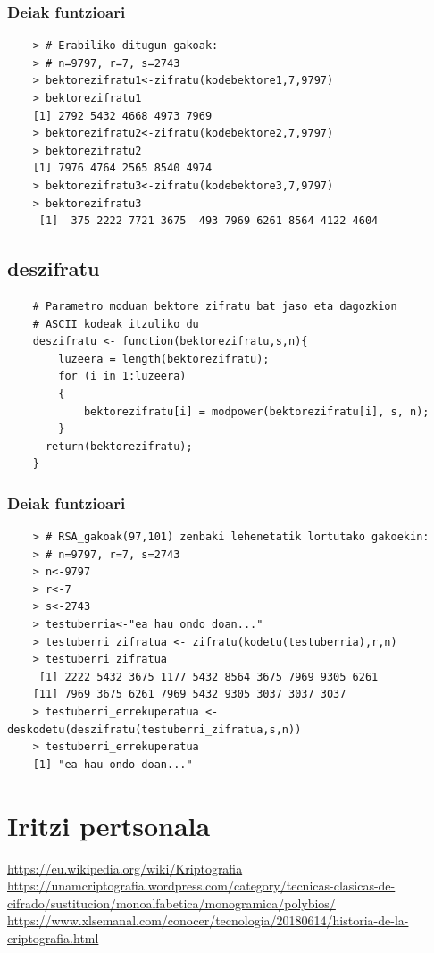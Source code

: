 \documentclass[12pt]{basque-book}
\begin{document}
\subsection{Deiak funtzioari}
\begin{verbatim}
    > # Erabiliko ditugun gakoak:
    > # n=9797, r=7, s=2743
    > bektorezifratu1<-zifratu(kodebektore1,7,9797)
    > bektorezifratu1
    [1] 2792 5432 4668 4973 7969
    > bektorezifratu2<-zifratu(kodebektore2,7,9797)
    > bektorezifratu2
    [1] 7976 4764 2565 8540 4974
    > bektorezifratu3<-zifratu(kodebektore3,7,9797)
    > bektorezifratu3
     [1]  375 2222 7721 3675  493 7969 6261 8564 4122 4604
\end{verbatim}

\newpage

\section{deszifratu}
\begin{verbatim}
    # Parametro moduan bektore zifratu bat jaso eta dagozkion 
    # ASCII kodeak itzuliko du
    deszifratu <- function(bektorezifratu,s,n){
        luzeera = length(bektorezifratu);
        for (i in 1:luzeera)
        {
            bektorezifratu[i] = modpower(bektorezifratu[i], s, n);
        }
      return(bektorezifratu);
    }
\end{verbatim}

\subsection{Deiak funtzioari}
\begin{verbatim}
    > # RSA_gakoak(97,101) zenbaki lehenetatik lortutako gakoekin:
    > # n=9797, r=7, s=2743
    > n<-9797
    > r<-7
    > s<-2743
    > testuberria<-"ea hau ondo doan..."
    > testuberri_zifratua <- zifratu(kodetu(testuberria),r,n)
    > testuberri_zifratua
     [1] 2222 5432 3675 1177 5432 8564 3675 7969 9305 6261
    [11] 7969 3675 6261 7969 5432 9305 3037 3037 3037
    > testuberri_errekuperatua <- deskodetu(deszifratu(testuberri_zifratua,s,n))
    > testuberri_errekuperatua
    [1] "ea hau ondo doan..."
\end{verbatim}


\chapter{Iritzi pertsonala}





\begin{thebibliography}{}
\bibitem{}\url{https://eu.wikipedia.org/wiki/Kriptografia}
\bibitem{}\url{https://unamcriptografia.wordpress.com/category/tecnicas-clasicas-de-cifrado/sustitucion/monoalfabetica/monogramica/polybios/}
\bibitem{}\url{https://www.xlsemanal.com/conocer/tecnologia/20180614/historia-de-la-criptografia.html}

\end{thebibliography}
\end{document}
